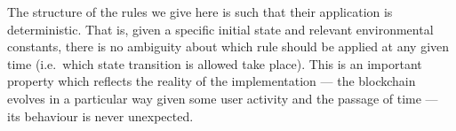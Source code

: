 The structure of the rules we give here is such that their application is
deterministic. That is, given a specific initial state and relevant environmental
constants, there is no ambiguity
about which rule should be applied at any given time (i.e.~which state
transition is allowed take place). This is an important property which reflects
the reality of the implementation --- the blockchain evolves in a particular way
given some user activity and the passage of time --- its behaviour is
never unexpected.
